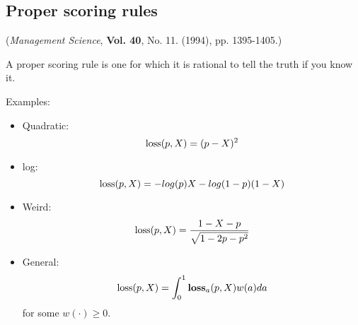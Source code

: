 \documentclass[20pt]{extarticle} %
\begin{document}
\subsection*{Proper scoring rules}

({\em Management Science}, {\bf Vol. 40}, No. 11. (1994), pp. 1395-1405.)

A proper scoring rule is one for which it is rational to tell the
truth if you know it.

Examples:
\begin{itemize}
\item Quadratic:
\begin{displaymath}
\hbox{loss}(p,X) = (p - X)^2
\end{displaymath}
\item log:
\begin{displaymath}
\hbox{loss}(p,X) = -log(p)X - log(1-p)(1-X)
\end{displaymath}
\item Weird:
\begin{displaymath}
\hbox{loss}(p,X) = \frac{1 - X- p}{\sqrt{1 - 2p - p^2}}
\end{displaymath}
\item General:
\begin{displaymath}
\hbox{loss}(p,X) = \int_0^1  \hbox{\bf loss}_a(p,X) w(a) da
\end{displaymath}
for some $w(\cdot)\ge 0$.
\end{itemize}
\end{document}
